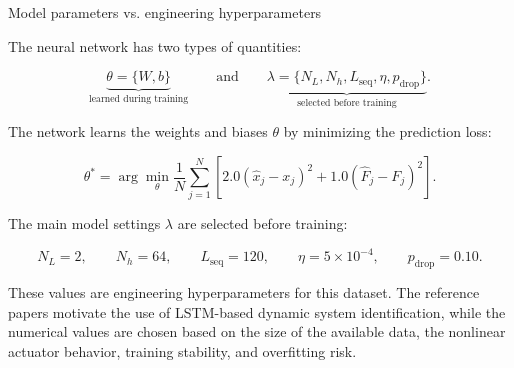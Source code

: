 \documentclass[11pt]{article}
\begin{document}
\begin{summarybox}{Model parameters vs. engineering hyperparameters}

The neural network has two types of quantities:

\[
\underbrace{\theta=\{W,b\}}_{\text{learned during training}}
\qquad\text{and}\qquad
\underbrace{\lambda=\{N_L,N_h,L_{\mathrm{seq}},\eta,p_{\mathrm{drop}}\}}_{\text{selected before training}}.
\]

The network learns the weights and biases $\theta$ by minimizing the prediction loss:

\[
\theta^{*}
=
\arg\min_{\theta}
\frac{1}{N}
\sum_{j=1}^{N}
\left[
2.0(\hat{x}_j-x_j)^2
+
1.0(\hat{F}_j-F_j)^2
\right].
\]

The main model settings $\lambda$ are selected before training:

\[
N_L=2,\qquad
N_h=64,\qquad
L_{\mathrm{seq}}=120,\qquad
\eta=5\times10^{-4},\qquad
p_{\mathrm{drop}}=0.10.
\]

These values are engineering hyperparameters for this dataset. The reference papers motivate the use of LSTM-based dynamic system identification, while the numerical values are chosen based on the size of the available data, the nonlinear actuator behavior, training stability, and overfitting risk.
\end{summarybox}
\end{document}
